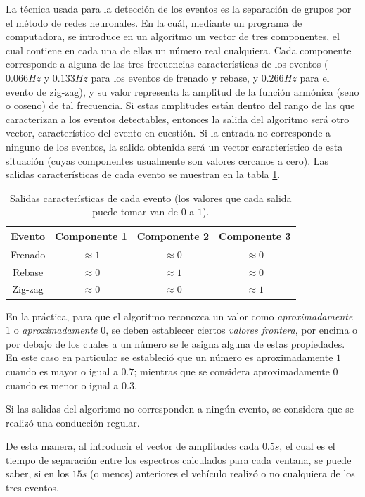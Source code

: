 La técnica usada para la detección de los eventos es la separación de grupos por el método de redes neuronales. 
En la cuál, mediante un programa de computadora, se introduce en un algoritmo un vector de tres componentes, el cual contiene en cada una de ellas un número real cualquiera. 
Cada componente corresponde a alguna de las tres frecuencias características de los eventos ($0.066Hz$ y $0.133Hz$ para los eventos de frenado y rebase, y $0.266Hz$ para el evento de zig-zag), y su valor representa la amplitud de la función armónica (seno o coseno) de tal frecuencia. 
Si estas amplitudes están dentro del rango de las que caracterizan a los eventos detectables, entonces la salida del algoritmo será otro vector, característico del evento en cuestión. 
Si la entrada no corresponde a ninguno de los eventos, la salida obtenida será un vector característico de esta situación (cuyas componentes usualmente son valores cercanos a cero).
Las salidas características de cada evento se muestran en la tabla \ref{tablasalidas}.\\

\begin{table}[H]
\centering
\begin{tabular}{c|c|c|c}
\hline \hline
\bf Evento &\bf Componente 1 &\bf Componente 2 &\bf Componente 3\\ 
\hline \hline
Frenado & $\approx 1$ & $\approx 0$ & $\approx 0$ \\ 
Rebase & $\approx 0$ & $\approx 1$ & $\approx 0$ \\ 
Zig-zag & $\approx 0$ & $\approx 0$ & $\approx 1$ \\
\hline \hline
\end{tabular}
\caption{Salidas características de cada evento (los valores que cada salida puede tomar van de $0$ a $1$).}
\label{tablasalidas}
\end{table}

En la práctica, para que el algoritmo reconozca un valor como {\em aproximadamente} $1$ o {\em aproximadamente} $0$, se deben establecer ciertos {\em valores frontera}, por encima o por debajo de los cuales a un número se le asigna alguna de estas propiedades.
En este caso en particular se estableció que un número es aproximadamente $1$ cuando es mayor o igual a $0.7$; mientras que se considera aproximadamente $0$ cuando es menor o igual a $0.3$.

Si las salidas del algoritmo no corresponden a ningún evento, se considera que se realizó una conducción regular.

De esta manera, al introducir el vector de amplitudes cada $0.5s$, el cual es el tiempo de separación entre los espectros calculados para cada ventana, se puede saber, si en los $15s$ (o menos) anteriores el vehículo realizó o no cualquiera de los tres eventos.

